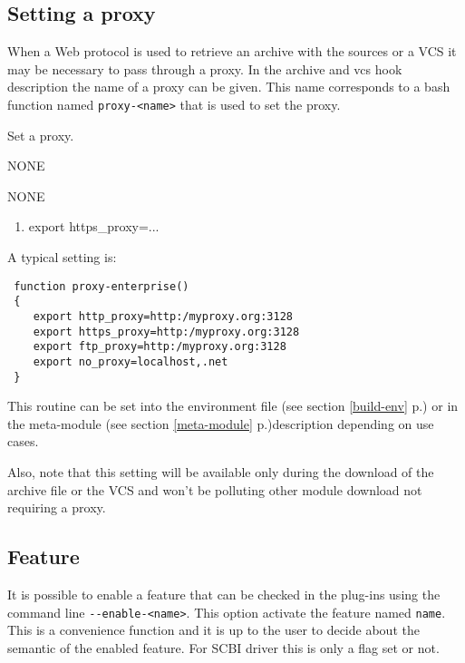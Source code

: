 \documentclass[a4paper,12pt,twoside]{article}
\newcommand{\code}[1]{\texttt{#1}}
\newcommand{\seeref}[1]{see section \ref{#1} p.\pageref{#1}}
\newcommand{\ddash}{-{}-}
\begin{document}
\subsection{Setting a proxy}
\label{proxy}

When a Web protocol is used to retrieve an archive with the sources or a VCS it may be necessary to pass through a proxy. In the archive and vcs hook description the name of a proxy can be given. This name corresponds to a bash function named \code{proxy-<name>} that is used to set the proxy.

\begin{description}[style=nextline]
	\item[proxy-<name>] Set a proxy.
	\begin{description}[font=\textit,style=standard]
		\item[parameter] \tabto{2cm} NONE
		\item[return] \tabto{2cm} NONE
		\begin{enumerate}
			\item export https\_proxy=...
		\end{enumerate}
	\end{description}
\end{description}

A typical setting is:

\begin{lstlisting}
 function proxy-enterprise()
 {
    export http_proxy=http:/myproxy.org:3128
    export https_proxy=http:/myproxy.org:3128
    export ftp_proxy=http:/myproxy.org:3128
    export no_proxy=localhost,.net
 }
\end{lstlisting}

This routine can be set into the environment file (\seeref{build-env}) or in the meta-module (\seeref{meta-module})description depending on use cases.

Also, note that this setting will be available only during the download of the archive file or the VCS and won't be polluting other module download not requiring a proxy.

\subsection{Feature}
\label{enable-feature}

It is possible to enable a feature that can be checked in the plug-ins using the command line \code{\ddash{}enable-<name>}. This option activate the feature named \code{name}. This is a convenience function and it is up to the user to decide about the semantic of the enabled feature. For SCBI driver this is only a flag set or not.
\end{document}
